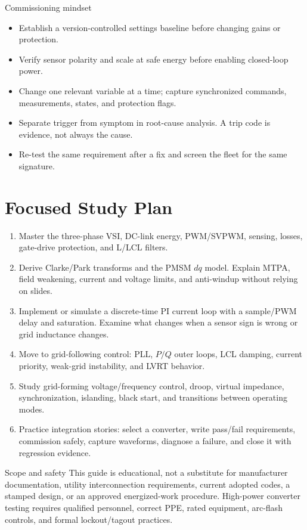 \documentclass[11pt]{article}
\begin{document}
\begin{checklistbox}{Commissioning mindset}
\begin{itemize}
\item Establish a version-controlled settings baseline before changing gains or protection.
\item Verify sensor polarity and scale at safe energy before enabling closed-loop power.
\item Change one relevant variable at a time; capture synchronized commands, measurements, states, and protection flags.
\item Separate trigger from symptom in root-cause analysis. A trip code is evidence, not always the cause.
\item Re-test the same requirement after a fix and screen the fleet for the same signature.
\end{itemize}
\end{checklistbox}

\section{Focused Study Plan}
\begin{enumerate}
\item Master the three-phase VSI, DC-link energy, PWM/SVPWM, sensing, losses, gate-drive protection, and L/LCL filters.
\item Derive Clarke/Park transforms and the PMSM $dq$ model. Explain MTPA, field weakening, current and voltage limits, and anti-windup without relying on slides.
\item Implement or simulate a discrete-time PI current loop with a sample/PWM delay and saturation. Examine what changes when a sensor sign is wrong or grid inductance changes.
\item Move to grid-following control: PLL, $P/Q$ outer loops, LCL damping, current priority, weak-grid instability, and LVRT behavior.
\item Study grid-forming voltage/frequency control, droop, virtual impedance, synchronization, islanding, black start, and transitions between operating modes.
\item Practice integration stories: select a converter, write pass/fail requirements, commission safely, capture waveforms, diagnose a failure, and close it with regression evidence.
\end{enumerate}

\begin{warningbox}{Scope and safety}
This guide is educational, not a substitute for manufacturer documentation, utility interconnection requirements, current adopted codes, a stamped design, or an approved energized-work procedure. High-power converter testing requires qualified personnel, correct PPE, rated equipment, arc-flash controls, and formal lockout/tagout practices.
\end{warningbox}
\end{document}
